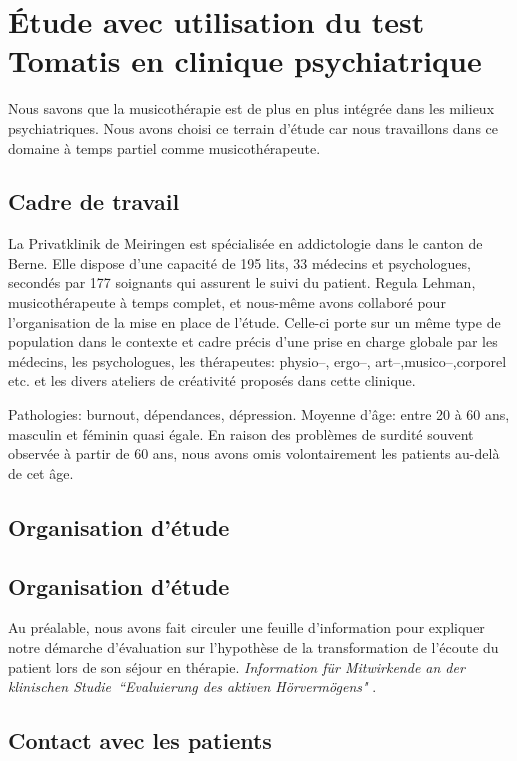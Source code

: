 \chapter[\'Etude en clinique]{\'Etude avec utilisation du test Tomatis en clinique psychiatrique}

Nous savons que la musicothérapie est de plus en plus intégrée dans
les milieux psychiatriques. Nous avons choisi ce terrain d'étude car 
nous  travaillons dans ce domaine  à temps partiel comme musicothérapeute.

\section{Cadre de travail}
 La Privatklinik
de Meiringen est  spécialisée en
addictologie dans le canton de Berne. Elle dispose d'une capacité de 195 lits, 33 médecins et
psychologues, secondés par 177 soignants qui assurent le suivi du
patient. Regula Lehman, musicothérapeute à temps complet, et nous-même avons
collaboré  pour l'organisation de la mise en place de l'étude. Celle-ci porte sur un même type de
population dans le contexte et cadre  précis d'une prise en charge globale
par les médecins, les psychologues, les thérapeutes: physio--,
ergo--, art--,musico--,corporel etc. et les divers ateliers de créativité proposés dans
cette clinique. 

Pathologies:  burnout, dépendances,
dépression.
Moyenne d'âge:  entre 20 à 60 ans, masculin et
féminin quasi égale. 
En raison des problèmes de surdité souvent observée à partir de 60 ans, nous avons omis volontairement les patients au-delà de cet âge.
\section{Organisation d'étude}

\section{Organisation d'étude}
Au préalable, nous avons fait circuler une
feuille d'information pour expliquer notre démarche d'évaluation sur
l'hypothèse de la transformation de l'écoute du patient lors de son
séjour en thérapie. \emph{Information für Mitwirkende an der klinischen
Studie\  ``Evaluierung des aktiven Hörvermögens" }. 
 
 \section{Contact avec les patients}
 

